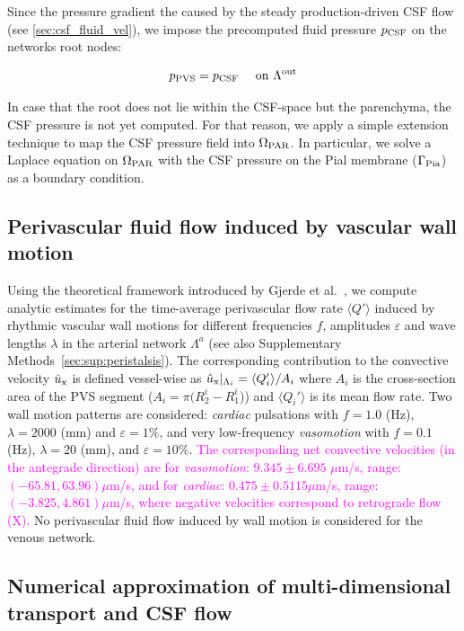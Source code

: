 \documentclass[fleqn,10pt]{wlscirep}
\newcommand{\mer}[1]{\textcolor{magenta}{#1}}
\begin{document}
Since the pressure gradient the caused by the steady production-driven CSF flow (see \cref{sec:csf_fluid_vel}), we impose the precomputed fluid pressure $p_{\rm CSF}$ on the networks root nodes:

\begin{equation}
    p_{\rm PVS} = p_{\rm CSF} \quad \text{ on } \Lambda^{\rm out}
\end{equation}

In case that the root does not lie within the CSF-space but the parenchyma, the CSF pressure is not yet computed. For that reason, we apply a simple extension technique to map the CSF pressure field into $\Omega_{\rm PAR}$. In particular, we solve a Laplace equation on $\Omega_{\rm PAR}$ with the CSF pressure on the Pial membrane ($\Gamma_{\rm Pia}$) as a boundary condition.


\subsection*{Perivascular fluid flow induced by vascular wall motion}

Using the theoretical framework introduced by Gjerde et
al.~\cite{gjerde2023directional}, we compute analytic estimates for
the time-average perivascular flow rate $\langle Q' \rangle$ induced
by rhythmic vascular wall motions for different frequencies $f$,
amplitudes $\varepsilon$ and wave lengths $\lambda$ in the arterial
network $\Lambda^a$ (see also Supplementary
Methods~\ref{sec:sup:peristalsis}). The corresponding contribution to
the convective velocity $\hat{u}_{\rm x}$ is defined vessel-wise as
$\hat{u}_{\rm x}|_{\Lambda_i} = \langle Q'_i \rangle/A_i$ where $A_i$
is the cross-section area of the PVS segment ($A_i = \pi (R_2^i -
R_1^i$)) and $\langle Q_i' \rangle$ is its mean flow rate. Two wall
motion patterns are considered: \emph{cardiac} pulsations with $f =
1.0$ (Hz), $\lambda = 2000$ (mm) and $\varepsilon = 1\%$, and very
low-frequency \emph{vasomotion} with $f = 0.1$ (Hz), $\lambda = 20$
(mm), and $\varepsilon = 10\%$. \mer{The corresponding net convective
velocities (in the antegrade direction) are for \emph{vasomotion}:
$9.345 \pm 6.695$ $\mu$m/s, range: $(-65.81, 63.96) \mu$m/s, and for
\emph{cardiac}: $0.475 \pm 0.5115 \mu$m/s, range: $(- 3.825, 4.861)
\mu$m/s, where negative velocities correspond to retrograde flow
(\Cref{fig:pvs}\mer{X}).} No perivascular fluid flow induced by wall
motion is considered for the venous network.


\subsection*{Numerical approximation of multi-dimensional transport and CSF flow}
\end{document}
